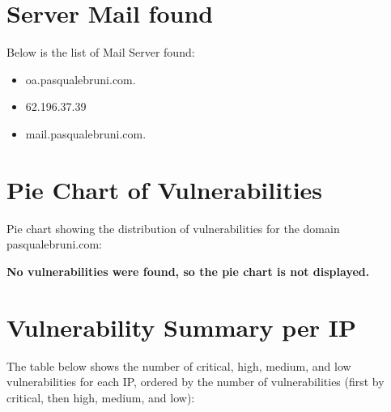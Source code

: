 \documentclass{article}
\begin{document}
\clearpage

\section{Server Mail found}

Below is the list of Mail Server found:

\begin{itemize}
    
        
            \item oa.pasqualebruni.com.
        
            \item 62.196.37.39
        
            \item mail.pasqualebruni.com.
        
    
\end{itemize}

\clearpage

\section{Pie Chart of Vulnerabilities}

\noindent Pie chart showing the distribution of vulnerabilities for the domain \ttfamily pasqualebruni.com:


\noindent \textbf{No vulnerabilities were found, so the pie chart is not displayed.}


\clearpage

\section{Vulnerability Summary per IP}

\noindent The table below shows the number of critical, high, medium, and low vulnerabilities for each IP, ordered by the number of vulnerabilities (first by critical, then high, medium, and low):
\end{document}
